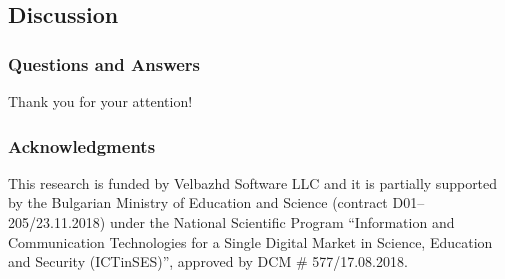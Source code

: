 \documentclass{beamer}
\begin{document}
\subsection{Discussion}

\begin{frame}
\frametitle{Questions and Answers}
\center \huge{Thank you for your attention!}
\end{frame}

\begin{frame}
\frametitle{Acknowledgments}
This research is funded by Velbazhd Software LLC and it is partially supported by the Bulgarian Ministry of Education and Science (contract D01–205/23.11.2018) under the National Scientific Program ``Information and Communication Technologies for a Single Digital Market in Science, Education and Security (ICTinSES)'', approved by DCM \# 577/17.08.2018.
\end{frame}
\end{document}

